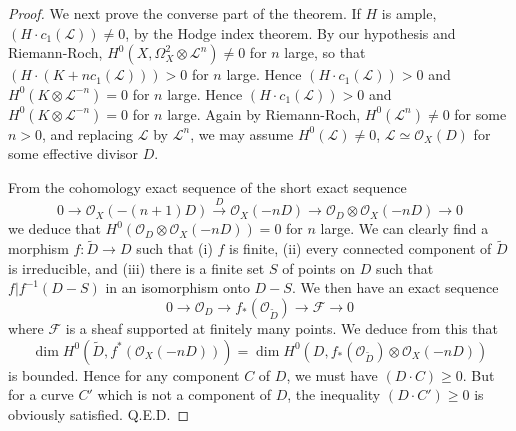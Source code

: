 \begin{proof}
We next prove the converse part of the theorem. If $H$ is ample, $(H \cdot c_1 (\mathcal{L})) \neq 0$, by the Hodge index theorem. By our hypothesis and Riemann-Roch, $H^0 (X , \Omega^2_X \otimes \mathcal{L}^n) \neq 0$ for $n$ large, so that $( H \cdot (K + nc_1 (\mathcal{L}))) >0$ for $n$ large. Hence $(H \cdot c_1 (\mathcal{L}))>0$ and $H^0 (K \otimes \mathcal{L}^{-n})=0$ for $n$ large. Hence $(H \cdot c_1 (\mathcal{L}))>0$ and $H^0 (K \otimes \mathcal{L}^{-n}) = 0$ for $n$ large. Again by Riemann-Roch, $H^0(\mathcal{L}^n) \neq 0$ for some $n>0$, and replacing $\mathcal{L}$ by $\mathcal{L}^n$, we may assume $H^0(\mathcal{L}) \neq 0$, $\mathcal{L} \simeq \mathcal{O}_X (D)$ for some effective divisor $D$.

From the cohomology exact sequence of the short exact sequence
$$
0 \to \mathcal{O}_X(-(n+1)D) \xrightarrow{D} \mathcal{O}_X (-nD) \to \mathcal{O}_D \otimes \mathcal{O}_X (-nD) \to 0
$$
we deduce that $H^0 (\mathcal{O}_D \otimes \mathcal{O}_X (-nD)) = 0$ for $n$ large. We can clearly find a morphism $f : \tilde{D} \to D$ such that (i) $f$ is finite, (ii) every connected component of $\tilde{D}$ is irreducible, and (iii) there is a finite set $S$ of points on $D$ such that $f |f^{-1} (D-S)$ in an isomorphism onto $D-S$. We then have an exact sequence
$$
0 \to \mathcal{O}_D \to f_* (\mathcal{O}_{\tilde{D}}) \to \mathcal{F} \to 0
$$
where $\mathcal{F}$ is a sheaf supported at finitely many points. We deduce from this that
$$
\dim H^0 (\tilde{D}, f^* (\mathcal{O}_X (-n D))) = \dim H^0 (D, f_* (\mathcal{O}_{\tilde{D}}) \otimes \mathcal{O}_X (-n D))
$$
is bounded. Hence for any component $C$ of $D$, we must have $(D \cdot C) \geqslant 0$. But for a curve $C'$ which is not a component of $D$, the inequality $(D \cdot C') \geqslant 0$ is obviously satisfied. \hfill{Q.E.D.}
\end{proof}   
